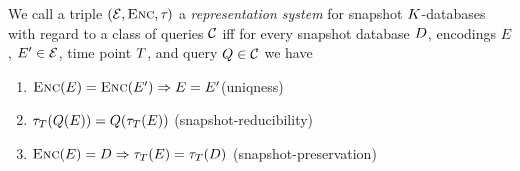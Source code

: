 \begin{defi}\label{def:repr-system}
We call a triple $(\mathcal{E}, \textsc{Enc}, \tau_{})$ a \emph{representation system} for %
snapshot $K$-databases with regard to a class of queries $\mathcal{C}$ iff for every snapshot database $D$, encodings $E$, $E' \in \mathcal{E}$, time point $T$, and query $Q \in \mathcal{C}$ we have
\begin{enumerate}
\item $\textsc{Enc}(E) = \textsc{Enc}(E') \Rightarrow E=E'$\hfill(uniqness)
\item $%
  \tSlice{\tPoint}(\query(E)) = \query(\tSlice{\tPoint}(E))$
\hfill (snapshot-reducibility)
\item $\textsc{Enc}(E) = D \Rightarrow \tau_{T}(E) = \tau_{T}(D)$ \hfill (snapshot-preservation)
\end{enumerate}
\end{defi}






